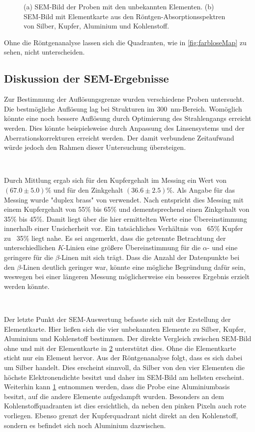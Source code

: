 \begin{figure}[H]
\begin{subfigure}[c]{.45\textwidth}
			\subcaption{}
			\label{fig:bunteMap}
		\end{subfigure}
		\caption{(a) SEM-Bild der Proben mit den unbekannten Elementen.
		(b) SEM-Bild mit Elementkarte aus den Röntgen-Absorptionsspektren von Silber, Kupfer, Aluminium und Kohlenstoff.}
		\label{fig:elementalMap}
	\end{figure}
	Ohne die Röntgenanalyse lassen sich die Quadranten, wie in \cref{fig:farbloseMap} zu sehen, nicht unterscheiden.

\subsection{Diskussion der SEM-Ergebnisse}

	Zur Bestimmung der Auflösungsgrenze wurden verschiedene Proben untersucht.
	Die bestmögliche Auflösung lag bei Strukturen im \SI{300}{\nano\meter}-Bereich.
	Womöglich könnte eine noch bessere Auflösung durch Optimierung des Strahlengangs erreicht werden.
	Dies könnte beispielsweise durch Anpassung des Linsensystems und der Aberrationskorrekturen erreicht werden.
	Der damit verbundene Zeitaufwand würde jedoch den Rahmen dieser Untersuchung übersteigen.

	\

	Durch Mittlung ergab sich für den Kupfergehalt im Messing ein Wert von $(67.0\pm5.0)\%$ und für den Zinkgehalt $(36.6\pm2.5)\%$.
	Als Angabe für das Messing wurde "duplex brass" von \cite{wwu} verwendet.
	Nach \cite{wikiMs} entspricht dies Messing mit einem Kupfergehalt von 55\% bis 65\% und dementsprechend einen Zinkgehalt von 35\% bis 45\%.
	Damit liegt über die hier ermittelten Werte eine Übereinstimmung innerhalb einer Unsicherheit vor.
	Ein tatsächliches Verhältnis von ~65\% Kupfer zu ~35\% liegt nahe.
	Es sei angemerkt, dass die getrennte Betrachtung der unterschiedlichen $K$-Linien eine größere Übereinstimmung für die $\alpha$- und eine geringere für die $\beta$-Linen mit sich trägt.
	Dass die Anzahl der Datenpunkte bei den $\beta$-Linen deutlich geringer war, könnte eine mögliche Begründung dafür sein, weswegen bei einer längeren Messung möglicherweise ein besseres Ergebnis erzielt werden könnte.

	\

	Der letzte Punkt der SEM-Auswertung befasste sich mit der Erstellung der Elementkarte.
	Hier ließen sich die vier unbekannten Elemente zu Silber, Kupfer, Aluminium und Kohlenstoff bestimmen.
	Der direkte Vergleich zwischen SEM-Bild ohne und mit der Elementkarte in \cref{fig:elementalMap} unterstützt dies.
	Ohne die Elementkarte sticht nur ein Element hervor.
	Aus der Röntgenanalyse folgt, dass es sich dabei um Silber handelt.
	Dies erscheint sinnvoll, da Silber von den vier Elementen die höchste Elektronendichte besitzt und daher im SEM-Bild am hellsten erscheint.
	Weiterhin kann \cref{fig:bunteMap} entnommen werden, dass die Probe eine Aluminiumbasis besitzt, auf die andere Elemente aufgedampft wurden.
	Besonders an dem Kohlenstoffquadranten ist dies ersichtlich, da neben den pinken Pixeln auch rote vorliegen.
	Ebenso grenzt der Kupferquadrant nicht direkt an den Kohlenstoff, sondern es befindet sich noch Aluminium dazwischen.

